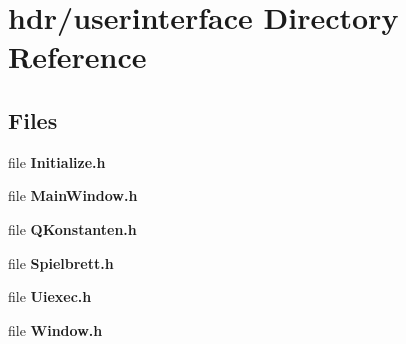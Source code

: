 \section{hdr/userinterface Directory Reference}
\label{dir_5cd1f6435bf62c6a6fa20b8fa16990bc}
\subsection*{Files}
\begin{DoxyCompactItemize}
\item 
file {\bfseries Initialize.\-h}
\item 
file {\bfseries Main\-Window.\-h}
\item 
file {\bfseries Q\-Konstanten.\-h}
\item 
file {\bfseries Spielbrett.\-h}
\item 
file {\bfseries Uiexec.\-h}
\item 
file {\bfseries Window.\-h}
\end{DoxyCompactItemize}

